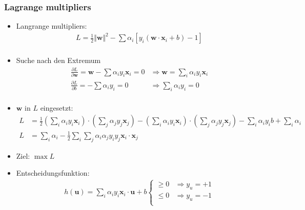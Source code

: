\begin{frame}
    \frametitle{Lagrange multipliers}

    \begin{itemize}
        \item Langrange multipliers:
            \begin{align*}
                L = \frac{1}{2} \Vert \boldsymbol{w} \Vert^2 - \sum \alpha_i \left[ y_i ( \boldsymbol{w} \cdot \boldsymbol{x}_i + b) - 1 \right] \\
            \end{align*}
        \item Suche nach den Extremum
            \begin{align*}
                \frac{\partial L}{\partial \boldsymbol{w}} = \boldsymbol{w} - \sum \alpha_i y_i \boldsymbol{x}_i = 0 &\Rightarrow \boldsymbol{w} = \sum_i \alpha_i y_i \boldsymbol{x}_i \\
                \frac{\partial L}{\partial b} = -\sum \alpha_i y_i = 0 &\Rightarrow \sum_i \alpha_i y_i = 0 \\
            \end{align*}
        \item $\boldsymbol{w}$ in $L$ eingesetzt:
            \begin{align*}
                L &= \frac{1}{2} (\sum_i \alpha_i y_i \boldsymbol{x}_i) \cdot (\sum_j \alpha_j y_j \boldsymbol{x}_j) - (\sum_i \alpha_i y_i \boldsymbol{x}_i) \cdot (\sum_j \alpha_j y_j \boldsymbol{x}_j) - \sum_i \alpha_i y_i b + \sum_i \alpha_i \\
                L &= \sum_i \alpha_i - \frac{1}{2} \sum_i \sum_j \alpha_i \alpha_j y_i y_j \boldsymbol{x}_i \cdot \boldsymbol{x}_j
            \end{align*}
        \item Ziel: $ \max L$
        \item Entscheidungsfunktion:
            \begin{align*}
                h(\boldsymbol{u}) = \sum_i \alpha_i y_i \boldsymbol{x}_i \cdot \boldsymbol{u} + b \begin{cases}
                    \geq 0 & \Rightarrow y_u = +1 \\
                    \leq 0 & \Rightarrow y_u = -1 \\
                \end{cases}
            \end{align*}
    \end{itemize}
\end{frame}

